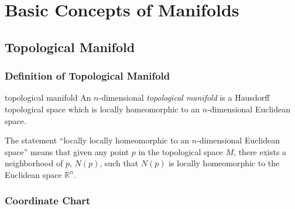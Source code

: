 \documentclass{report}
\begin{document}
\chapter{Basic Concepts of Manifolds}
\section{Topological Manifold}
\subsection{Definition of Topological Manifold}

\begin{Definition}{topological manifold}
    An $n$-dimensional \emph{topological manifold} is a Hausdorff topological space which is locally homeomorphic to an $n$-dimensional Euclidean space.
\end{Definition}

The statement “locally locally homeomorphic to an $n$-dimensional Euclidean space” means that given any point $p$ in the topological space $M$, there exists a neighborhood of $p$, $N(p)$, such that $N(p)$ is locally homeomorphic to the Euclidean space $\mathbb{R}^n$.

\subsection{Coordinate Chart}



\end{document}
